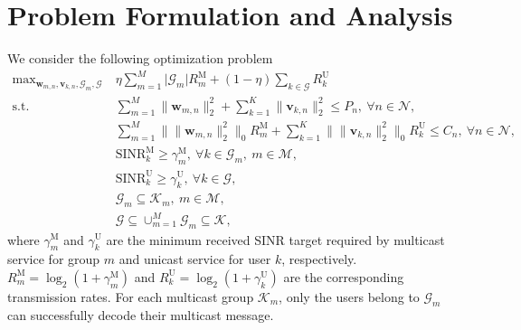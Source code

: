 \documentclass[12pt, draftclsnofoot, onecolumn]{IEEEtran}
\begin{document}
\section{Problem Formulation and Analysis}
We consider the following optimization problem
\begin{subequations}
\begin{align} 
\mathop{\text{max}}_{\mathbf{w}_{m,n}, \mathbf{v}_{k,n}, \mathcal{G}_m, \mathcal{G}} ~& \eta \sum_{m=1}^M \lvert \mathcal{G}_{m} \rvert R_{m}^{\text{M}} + (1 - \eta) \sum_{k \in \mathcal{G}} R_k^{\text{U}}  \label{obj:WSR}\\ 
\text{s.t.} \qquad \quad & \sum_{m=1}^M \lVert \mathbf{w}_{m,n} \rVert_2^2 + \sum_{k=1}^K \lVert \mathbf{v}_{k,n} \rVert_2^2 \leq P_n,~\forall n \in \mathcal{N}, \label{cons:WSR-power} \\
& \sum_{m=1}^M \big \| \lVert \mathbf{w}_{m,n} \rVert_2^2 \big \|_0 R_{m}^{\text{M}} + \sum_{k=1}^K \big \| \lVert \mathbf{v}_{k,n} \rVert_2^2 \big \|_0 R_k^{\text{U}} \leq C_n,~\forall n \in \mathcal{N}, \label{cons:WSR-backhaul}\\
& \text{SINR}_{k}^{\text{M}} \geq \gamma_{m}^{\text{M}},~\forall k \in \mathcal{G}_{m},~m \in \mathcal{M}, \label{cons:WSR-multicast-SINR}\\
& \text{SINR}_{k}^{\text{U}} \geq \gamma_k^{\text{U}},~\forall k \in \mathcal{G}, \label{cons:WSR-unicast-SINR}\\
& \mathcal{G}_m \subseteq \mathcal{K}_{m},~m \in \mathcal{M}, \label{cons:WSR-multicast-set} \\
& \mathcal{G} \subseteq  \cup_{m = 1}^M \mathcal{G}_{m} \subseteq \mathcal{K}, \label{cons:WSR-unicast-set}
\end{align} \label{pro:WSR}
\end{subequations}
where $\gamma_{m}^{\text{M}}$ and $\gamma_{k}^{\text{U}}$ are the minimum received SINR target required by multicast service for group $m$ and unicast service for user $k$, respectively. $R_m^{\text{M}} = \log_2(1 + \gamma_{m}^{\text{M}})$ and $R_k^{\text{U}} = \log_2(1 + \gamma_{k}^{\text{U}})$ are the corresponding transmission rates. For each multicast group $\mathcal{K}_{m}$, only the users belong to $\mathcal{G}_{m}$ can successfully decode their multicast message. 

\end{document}
